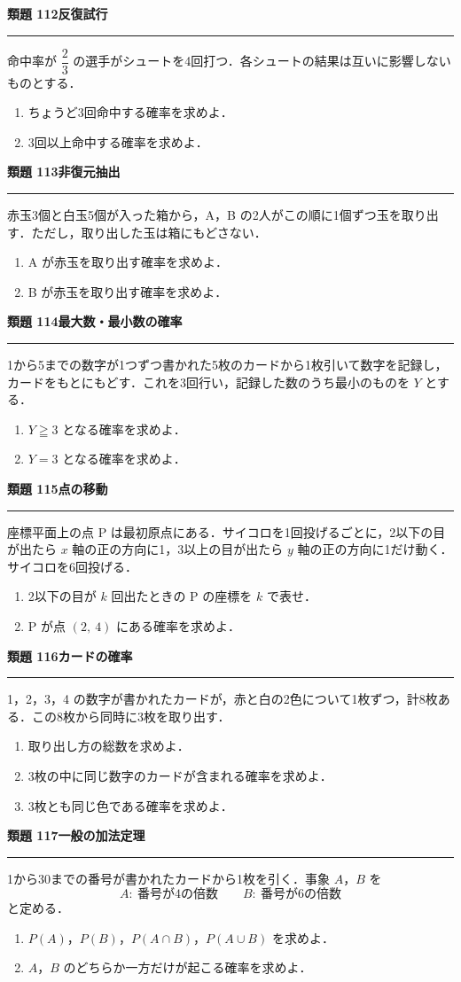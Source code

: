 \documentclass[a4paper,11pt]{ltjsarticle}
\newcommand{\mon}[2]{\Needspace{7\baselineskip}\vspace{10pt}%
  {\sffamily\bfseries 類題 #1\quad #2\par}\vspace{2pt}\hrule\vspace{4pt}}
\begin{document}
\mon{112}{反復試行}
命中率が $\dfrac23$ の選手がシュートを4回打つ．各シュートの結果は互いに影響しないものとする．
\begin{enumerate}
\item ちょうど3回命中する確率を求めよ．
\item 3回以上命中する確率を求めよ．
\end{enumerate}

\mon{113}{非復元抽出}
赤玉3個と白玉5個が入った箱から，A，B の2人がこの順に1個ずつ玉を取り出す．ただし，取り出した玉は箱にもどさない．
\begin{enumerate}
\item A が赤玉を取り出す確率を求めよ．
\item B が赤玉を取り出す確率を求めよ．
\end{enumerate}

\mon{114}{最大数・最小数の確率}
1から5までの数字が1つずつ書かれた5枚のカードから1枚引いて数字を記録し，カードをもとにもどす．これを3回行い，記録した数のうち最小のものを $Y$ とする．
\begin{enumerate}
\item $Y\geqq3$ となる確率を求めよ．
\item $Y=3$ となる確率を求めよ．
\end{enumerate}

\mon{115}{点の移動}
座標平面上の点 P は最初原点にある．サイコロを1回投げるごとに，2以下の目が出たら $x$ 軸の正の方向に1，3以上の目が出たら $y$ 軸の正の方向に1だけ動く．サイコロを6回投げる．
\begin{enumerate}
\item 2以下の目が $k$ 回出たときの P の座標を $k$ で表せ．
\item P が点 $(2,\ 4)$ にある確率を求めよ．
\end{enumerate}

\mon{116}{カードの確率}
1，2，3，4 の数字が書かれたカードが，赤と白の2色について1枚ずつ，計8枚ある．この8枚から同時に3枚を取り出す．
\begin{enumerate}
\item 取り出し方の総数を求めよ．
\item 3枚の中に同じ数字のカードが含まれる確率を求めよ．
\item 3枚とも同じ色である確率を求めよ．
\end{enumerate}

\mon{117}{一般の加法定理}
1から30までの番号が書かれたカードから1枚を引く．事象 $A$，$B$ を
\[A:\ \text{番号が4の倍数}\qquad B:\ \text{番号が6の倍数}\]
と定める．
\begin{enumerate}
\item $P(A)$，$P(B)$，$P(A\cap B)$，$P(A\cup B)$ を求めよ．
\item $A$，$B$ のどちらか一方だけが起こる確率を求めよ．
\end{enumerate}
\end{document}

